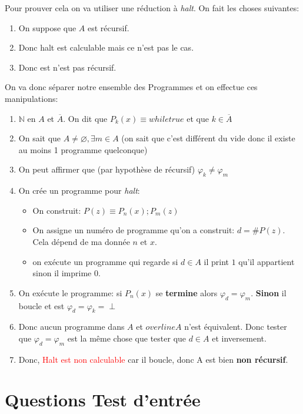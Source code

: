\documentclass{report}
\begin{document}
Pour prouver cela on va utiliser une réduction à \textit{halt}. On fait les choses suivantes:
\begin{enumerate}
\item On suppose que $A$ est récursif.
\item Donc halt est calculable mais ce n'est pas le cas.
\item Donc est n'est pas récursif.
\end{enumerate}
On va donc séparer notre ensemble des Programmes et on effectue ces manipulations:
\begin{enumerate}
\item $\mathbb{N}$ en $A$ et $\overline{A}$. On dit que $P_k(x) \equiv while true$ et que $k \in \overline{A}$
\item On sait que $A \neq \varnothing, \exists m \in A$ (on sait que c'est différent du vide donc il existe au moins 1 programme quelconque)
\item On peut affirmer que (par hypothèse de récursif) $\varphi_k \neq \varphi_m$
\item On crée un programme pour \textit{halt}:
	\begin{itemize}
	\item On construit: $P(z) \equiv P_n(x); P_m(z)$
	\item On assigne un numéro de programme qu'on a construit: $d = \#P(z)$. Cela dépend de ma donnée $n$ et $x$.
	\item on exécute un programme qui regarde si $d \in A$ il print $1$ qu'il appartient sinon il imprime $0$.
	\end{itemize}
\item On exécute le programme: si $P_n(x)$ se \textbf{termine} alors $\varphi_d = \varphi_m$. \textbf{Sinon} il boucle et est $\varphi_d = \varphi_k = \perp$
\item Donc aucun programme dans $A$ et $overline{A}$ n'est équivalent. Donc tester que $\varphi_d = \varphi_m$ est la même chose que tester que $d \in A$ et inversement.
\item Donc, \textcolor{red}{Halt est non calculable} car il boucle, donc A est bien \textbf{non récursif}.
\end{enumerate} 

\chapter{Questions Test d'entrée}
\end{document}
